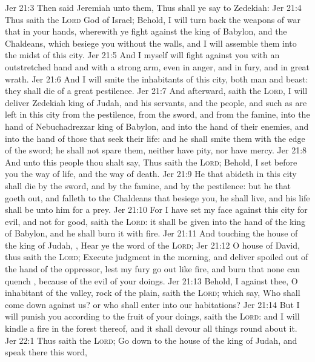 \vs Jer 21:3 Then said Jeremiah unto them, Thus shall ye say to Zedekiah:
\vs Jer 21:4 Thus saith the \textsc{Lord} God of Israel; Behold, I will turn back the weapons of war that  in your hands, wherewith ye fight against the king of Babylon, and  the Chaldeans, which besiege you without the walls, and I will assemble them into the midst of this city.
\vs Jer 21:5 And I myself will fight against you with an outstretched hand and with a strong arm, even in anger, and in fury, and in great wrath.
\vs Jer 21:6 And I will smite the inhabitants of this city, both man and beast: they shall die of a great pestilence.
\vs Jer 21:7 And afterward, saith the \textsc{Lord}, I will deliver Zedekiah king of Judah, and his servants, and the people, and such as are left in this city from the pestilence, from the sword, and from the famine, into the hand of Nebuchadrezzar king of Babylon, and into the hand of their enemies, and into the hand of those that seek their life: and he shall smite them with the edge of the sword; he shall not spare them, neither have pity, nor have mercy.
\vs Jer 21:8 And unto this people thou shalt say, Thus saith the \textsc{Lord}; Behold, I set before you the way of life, and the way of death.
\vs Jer 21:9 He that abideth in this city shall die by the sword, and by the famine, and by the pestilence: but he that goeth out, and falleth to the Chaldeans that besiege you, he shall live, and his life shall be unto him for a prey.
\vs Jer 21:10 For I have set my face against this city for evil, and not for good, saith the \textsc{Lord}: it shall be given into the hand of the king of Babylon, and he shall burn it with fire.
\vs Jer 21:11 And touching the house of the king of Judah, , Hear ye the word of the \textsc{Lord};
\vs Jer 21:12 O house of David, thus saith the \textsc{Lord}; Execute judgment in the morning, and deliver  spoiled out of the hand of the oppressor, lest my fury go out like fire, and burn that none can quench , because of the evil of your doings.
\vs Jer 21:13 Behold, I  against thee, O inhabitant of the valley,  rock of the plain, saith the \textsc{Lord}; which say, Who shall come down against us? or who shall enter into our habitations?
\vs Jer 21:14 But I will punish you according to the fruit of your doings, saith the \textsc{Lord}: and I will kindle a fire in the forest thereof, and it shall devour all things round about it.
\vs Jer 22:1 Thus saith the \textsc{Lord}; Go down to the house of the king of Judah, and speak there this word,
